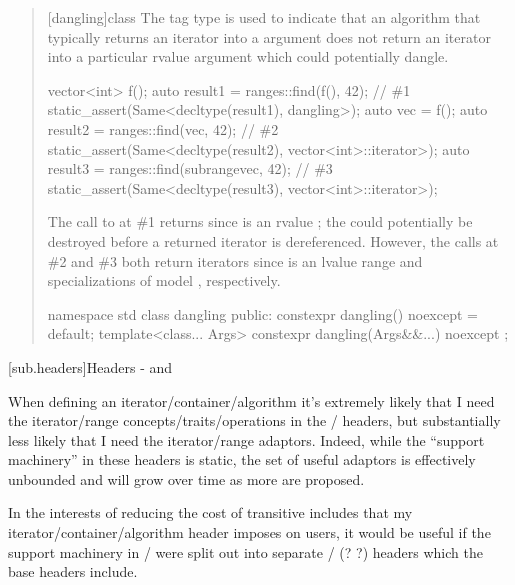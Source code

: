 \begin{quote}
\begin{addedblock}
\setcounter{chapter}{23}
\setcounter{section}{7}
[dangling]{class }
\pnum
The tag type  is used to indicate that an algorithm that
typically returns an iterator into a  argument does not
return an iterator into a particular rvalue  argument which
could potentially dangle.

\pnum
\begin{example}
\begin{codeblock}
vector<int> f();
auto result1 = ranges::find(f(), 42); // \#1
static_assert(Same<decltype(result1), dangling>);
auto vec = f();
auto result2 = ranges::find(vec, 42); // \#2
static_assert(Same<decltype(result2), vector<int>::iterator>);
auto result3 = ranges::find(subrange{vec}, 42); // \#3
static_assert(Same<decltype(result3), vector<int>::iterator>);
\end{codeblock}
The call to  at \#1 returns  since
 is an rvalue ; the  could potentially
be destroyed before a returned iterator is dereferenced. However, the calls
at \#2 and \#3 both return iterators since  is an lvalue range and
specializations of  model ,
respectively.
\end{example}

\begin{codeblock}
namespace std {
  class dangling {
  public:
    constexpr dangling() noexcept = default;
    template<class... Args>
      constexpr dangling(Args&&...) noexcept { }
  };
}
\end{codeblock}
\end{addedblock}
\end{quote}


\setcounter{chapter}{7}
[sub.headers]{Headers - and }

When defining an iterator/container/algorithm it's extremely likely that I need
the iterator/range concepts/traits/operations in the
/ headers, but substantially less likely that I
need the iterator/range adaptors. Indeed, while the ``support machinery'' in
these headers is static, the set of useful adaptors is effectively unbounded and
will grow over time as more are proposed.

In the interests of reducing the cost of transitive includes that my
iterator/container/algorithm header imposes on users, it would be useful if the
support machinery in / were split out into
separate /
(? ?) headers which the base
headers include.

